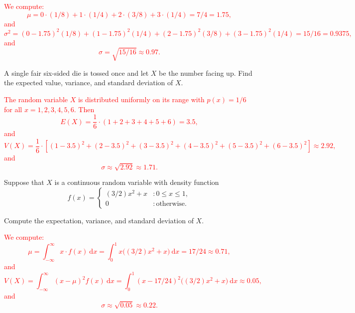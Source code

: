 \documentclass[12pt,reqno]{amsart}
\begin{document}
\bigskip
\textcolor{red}{We compute:
    \[\mu = 0\cdot(1/8) + 1 \cdot(1/4) + 2\cdot(3/8) + 3\cdot(1/4) = 7/4 = 1.75,\]
and
    \[\sigma^2 = (0-1.75)^2(1/8) + (1-1.75)^2(1/4) + (2-1.75)^2(3/8) + (3-1.75)^2(1/4) = 15/16 = 0.9375,\]
and
    \[\sigma = \sqrt{15/16} \approx 0.97.\]}



















\bigskip
\prob A single fair six-sided die is tossed once and let $X$ be the number facing up. Find the expected value, variance, and standard deviation of $X$.

\bigskip
\textcolor{red}{The random variable $X$ is distributed uniformly on its range with $p(x) = 1/6$ for all $x=1,2,3,4,5,6$. Then
    \[E(X) = \frac{1}{6} \cdot (1+2+3+4+5+6) = 3.5,\]
and
    \[V(X) = \frac{1}{6}\cdot \left[ (1-3.5)^2 + (2-3.5)^2 + (3-3.5)^2 + (4-3.5)^2 + (5-3.5)^2 + (6-3.5)^2\right] \approx 2.92, \]
and
    \[\sigma \approx \sqrt{2.92} \approx 1.71.\]}



















\bigskip
\prob Suppose that $X$ is a continuous random variable with density function
    \[f(x) = \begin{cases}
        (3/2)x^2 + x & : 0\leq x \leq 1, \\
        0 & : \text{otherwise}.
    \end{cases}\]

Compute the expectation, variance, and standard deviation of $X$.

\bigskip
\textcolor{red}{We compute:
    \[\mu = \int_{-\infty}^\infty x\cdot f(x) \ \text{d} x = \int_0^1 x\big((3/2)x^2+x \big) \ \text{d} x = 17/24 \approx 0.71, \]
and
    \[V(X) = \int_{-\infty}^\infty (x-\mu)^2f(x) \ \text{d} x = \int_0^1 (x-17/24)^2 \big( (3/2)x^2+x\big) \ \text{d}x \approx 0.05, \]
and
    \[\sigma \approx \sqrt{0.05} \approx 0.22.\]}
\end{document}
